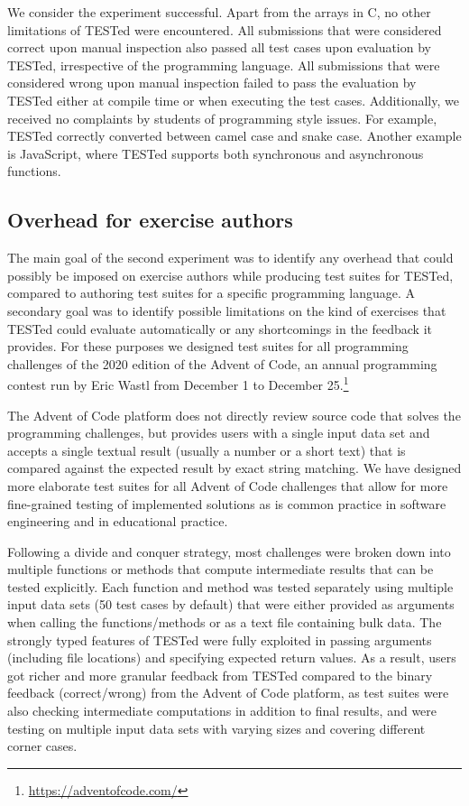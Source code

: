 \documentclass[../main]{subfiles}
\begin{document}
We consider the experiment successful.
Apart from the arrays in C, no other limitations of TESTed were encountered.
All submissions that were considered correct upon manual inspection also passed all test cases upon evaluation by TESTed, irrespective of the programming language.
All submissions that were considered wrong upon manual inspection failed to pass the evaluation by TESTed either at compile time or when executing the test cases.
Additionally, we received no complaints by students of programming style issues.
For example, TESTed correctly converted between camel case and snake case.
Another example is JavaScript, where TESTed supports both synchronous and asynchronous functions.

\subsection{Overhead for exercise authors}\label{subsec:overhead-for-exercise-designers}

The main goal of the second experiment was to identify any overhead that could possibly be imposed on exercise authors while producing test suites for TESTed, compared to authoring test suites for a specific programming language.
A secondary goal was to identify possible limitations on the kind of exercises that TESTed could evaluate automatically or any shortcomings in the feedback it provides.
For these purposes we designed test suites for all programming challenges of the 2020 edition of the Advent of Code, an annual programming contest run by Eric Wastl from December 1 to December 25.\footnote{\url{https://adventofcode.com/}}

The Advent of Code platform does not directly review source code that solves the programming challenges, but provides users with a single input data set and accepts a single textual result (usually a number or a short text) that is compared against the expected result by exact string matching.
We have designed more elaborate test suites for all Advent of Code challenges that allow for more fine-grained testing of implemented solutions as is common practice in software engineering and in educational practice.

Following a divide and conquer strategy, most challenges were broken down into multiple functions or methods that compute intermediate results that can be tested explicitly.
Each function and method was tested separately using multiple input data sets (50 test cases by default) that were either provided as arguments when calling the functions/methods or as a text file containing bulk data.
The strongly typed features of TESTed were fully exploited in passing arguments (including file locations) and specifying expected return values.
As a result, users got richer and more granular feedback from TESTed compared to the binary feedback (correct/wrong) from the Advent of Code platform, as test suites were also checking intermediate computations in addition to final results, and were testing on multiple input data sets with varying sizes and covering different corner cases.
\end{document}
